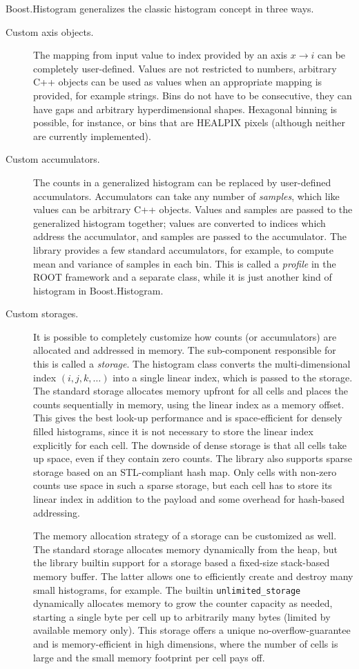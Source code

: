 \documentclass{webofc}
\begin{document}
Boost.Histogram generalizes the classic histogram concept in three ways.
\begin{description}
\item[Custom axis objects.] The mapping from input value to index provided by an axis $x \rightarrow i$ can be completely user-defined. Values are not restricted to numbers, arbitrary C++ objects can be used as values when an appropriate mapping is provided, for example strings. Bins do not have to be consecutive, they can have gaps and arbitrary hyperdimensional shapes. Hexagonal binning is possible, for instance, or bins that are HEALPIX pixels (although neither are currently implemented).

\item[Custom accumulators.] The counts in a generalized histogram can be replaced by user-defined accumulators. Accumulators can take any number of \emph{samples}, which like values can be arbitrary C++ objects. Values and samples are passed to the generalized histogram together; values are converted to indices which address the accumulator, and samples are passed to the accumulator. The library provides a few standard accumulators, for example, to compute mean and variance of samples in each bin. This is called a \emph{profile} in the ROOT framework and a separate class, while it is just another kind of histogram in Boost.Histogram.

\item[Custom storages.] It is possible to completely customize how counts (or accumulators) are allocated and addressed in memory. The sub-component responsible for this is called a \emph{storage}. The histogram class converts the multi-dimensional index $(i,j,k,\dots)$ into a single linear index, which is passed to the storage. The standard storage allocates memory upfront for all cells and places the counts sequentially in memory, using the linear index as a memory offset. This gives the best look-up performance and is space-efficient for densely filled histograms, since it is not necessary to store the linear index explicitly for each cell. The downside of dense storage is that all cells take up space, even if they contain zero counts. The library also supports sparse storage based on an STL-compliant hash map. Only cells with non-zero counts use space in such a sparse storage, but each cell has to store its linear index in addition to the payload and some overhead for hash-based addressing.

The memory allocation strategy of a storage can be customized as well. The standard storage allocates memory dynamically from the heap, but the library builtin support for a storage based a fixed-size stack-based memory buffer. The latter allows one to efficiently create and destroy many small histograms, for example. The builtin \verb|unlimited_storage| dynamically allocates memory to grow the counter capacity as needed, starting a single byte per cell up to arbitrarily many bytes (limited by available memory only). This storage offers a unique no-overflow-guarantee and is memory-efficient in high dimensions, where the number of cells is large and the small memory footprint per cell pays off.
\end{description}
\end{document}
